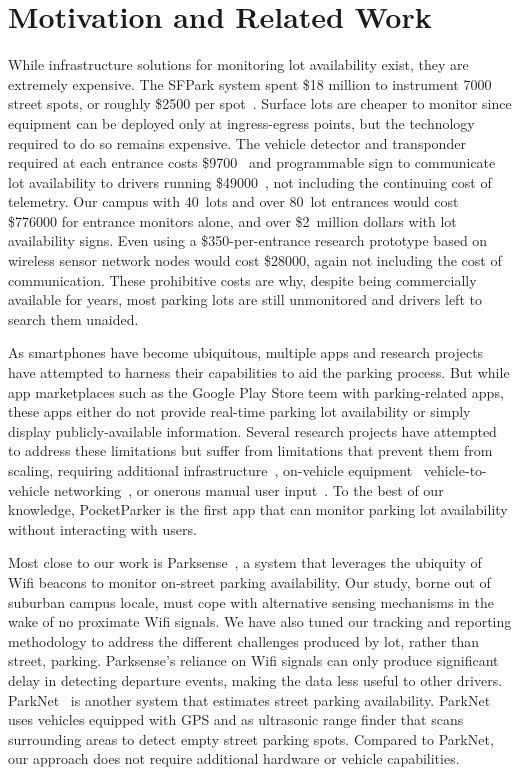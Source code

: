 \section{Motivation and Related Work}

While infrastructure solutions for monitoring lot availability exist, they
are extremely expensive. The SFPark system spent \$18 million to instrument
\num{7000} street spots, or roughly \$\num{2500} per spot~\cite{sfpark}.
Surface lots are cheaper to monitor since equipment can be deployed only at
ingress-egress points, but the technology required to do so remains
expensive. The vehicle detector and transponder required at each entrance
costs \$\num{9700}~\cite{car-detect} and programmable sign to communicate lot
availability to drivers running \$\num{49000}~\cite{mstp-park}, not including
the continuing cost of telemetry. Our campus with 40~lots and over 80~lot
entrances would cost \$\num{776000} for entrance monitors alone, and over
\$2~million dollars with lot availability signs. Even using a
\$\num{350}-per-entrance research prototype based on wireless sensor network
nodes would cost \$\num{28000}, again not including the cost of
communication. These prohibitive costs are why, despite being commercially
available for years, most parking lots are still unmonitored and drivers left
to search them unaided.

As smartphones have become ubiquitous, multiple apps and research projects
have attempted to harness their capabilities to aid the parking process. But
while app marketplaces such as the Google Play Store teem with
parking-related apps, these apps either do not provide real-time parking lot
availability or simply display publicly-available information. Several
research projects have attempted to address these limitations but suffer from
limitations that prevent them from scaling, requiring additional
infrastructure~\cite{5062057}, on-vehicle equipment~\cite{Mathur:2010:PDS}
vehicle-to-vehicle networking~\cite{Delot:2009:CRP, Mathur:2010:PDS}, or
onerous manual user input~\cite{Chen:2012:COS}. To the best of our knowledge,
PocketParker is the first app that can monitor parking lot availability
without interacting with users.

Most close to our work is Parksense~\cite{Nawaz:2013:PSB}, a system that
leverages the ubiquity of Wifi beacons to monitor on-street parking
availability. Our study, borne out of suburban campus locale, must cope with
alternative sensing mechanisms in the wake of no proximate Wifi signals. We
have also tuned our tracking and reporting methodology to address the
different challenges produced by lot, rather than street, parking.
Parksense's reliance on Wifi signals can only produce significant delay in
detecting departure events, making the data less useful to other drivers.
ParkNet~\cite{Mathur:2010:PDS} is another system that estimates street
parking availability. ParkNet uses vehicles equipped with GPS and as
ultrasonic range finder that scans surrounding areas to detect empty street
parking spots. Compared to ParkNet, our approach does not require additional
hardware or vehicle capabilities.

